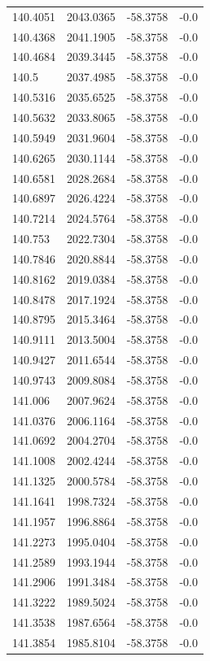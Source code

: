\begin{table}[H]
\begin{tabular}{llll}
140.4051 & 2043.0365 & -58.3758 & -0.0 \\
140.4368 & 2041.1905 & -58.3758 & -0.0 \\
140.4684 & 2039.3445 & -58.3758 & -0.0 \\
140.5 & 2037.4985 & -58.3758 & -0.0 \\
140.5316 & 2035.6525 & -58.3758 & -0.0 \\
140.5632 & 2033.8065 & -58.3758 & -0.0 \\
140.5949 & 2031.9604 & -58.3758 & -0.0 \\
140.6265 & 2030.1144 & -58.3758 & -0.0 \\
140.6581 & 2028.2684 & -58.3758 & -0.0 \\
140.6897 & 2026.4224 & -58.3758 & -0.0 \\
140.7214 & 2024.5764 & -58.3758 & -0.0 \\
140.753 & 2022.7304 & -58.3758 & -0.0 \\
140.7846 & 2020.8844 & -58.3758 & -0.0 \\
140.8162 & 2019.0384 & -58.3758 & -0.0 \\
140.8478 & 2017.1924 & -58.3758 & -0.0 \\
140.8795 & 2015.3464 & -58.3758 & -0.0 \\
140.9111 & 2013.5004 & -58.3758 & -0.0 \\
140.9427 & 2011.6544 & -58.3758 & -0.0 \\
140.9743 & 2009.8084 & -58.3758 & -0.0 \\
141.006 & 2007.9624 & -58.3758 & -0.0 \\
141.0376 & 2006.1164 & -58.3758 & -0.0 \\
141.0692 & 2004.2704 & -58.3758 & -0.0 \\
141.1008 & 2002.4244 & -58.3758 & -0.0 \\
141.1325 & 2000.5784 & -58.3758 & -0.0 \\
141.1641 & 1998.7324 & -58.3758 & -0.0 \\
141.1957 & 1996.8864 & -58.3758 & -0.0 \\
141.2273 & 1995.0404 & -58.3758 & -0.0 \\
141.2589 & 1993.1944 & -58.3758 & -0.0 \\
141.2906 & 1991.3484 & -58.3758 & -0.0 \\
141.3222 & 1989.5024 & -58.3758 & -0.0 \\
141.3538 & 1987.6564 & -58.3758 & -0.0 \\
141.3854 & 1985.8104 & -58.3758 & -0.0 \\

\end{tabular}
\end{table}
